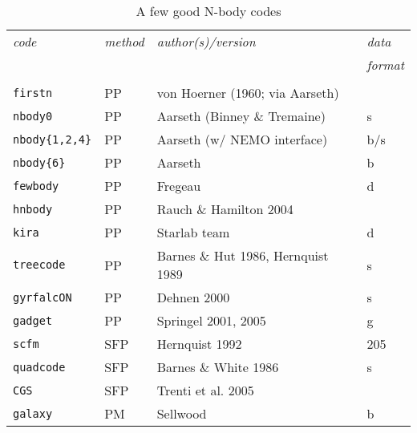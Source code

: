 {{%


\begin{center}
\begin{table}[h]
\caption{A few good N-body codes}
\begin{tabular}{||l|l|l|l||}

\hline 
{\it code} & {\it method} & {\it author(s)/version}  & {\it data} \\
       &&& {\it format} \\
\hline &&& \\

{\tt firstn} & PP & von Hoerner (1960; via Aarseth)  & \\

{\tt nbody0} & PP & Aarseth (Binney \& Tremaine) & s \\

{\tt nbody\{1,2,4\}} & PP & Aarseth (w/ NEMO interface) & b/s\\

{\tt nbody\{6\}} & PP &  Aarseth  & b \\

{\tt fewbody} & PP & Fregeau   & d \\

{\tt hnbody}  & PP & Rauch \& Hamilton 2004 & \\

{\tt kira} & PP & Starlab team & d \\

{\tt treecode} & PP & Barnes \& Hut 1986, Hernquist 1989 & s \\

{\tt gyrfalcON} & PP & Dehnen 2000 & s \\


{\tt gadget} & PP & Springel 2001, 2005  & g \\

{\tt scfm} & SFP & Hernquist 1992 & 205 \\

{\tt quadcode} & SFP & Barnes \& White 1986 & s \\

{\tt CGS} & SFP &  Trenti et al. 2005 & \\

{\tt galaxy} & PM & Sellwood  & b \\


\end{tabular}
\end{table}
\end{center}}}
